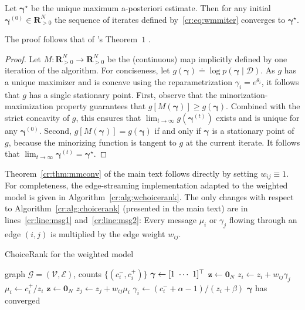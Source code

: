 \begin{theorem}
\label{cr:thm:wmmconv}
Let $\bm{\gamma}^\star$ be the unique maximum a-posteriori estimate.
Then for any initial $\bm{\gamma}^{(0)} \in \mathbf{R}^N_{> 0}$ the sequence of iterates defined by~\eqref{cr:eq:wmmiter} converges to $\bm{\gamma}^\star$.
\end{theorem}

The proof follows that of \citeauthor{hunter2004mm}'s Theorem~$1$ \citeyearpar{hunter2004mm}.

\begin{proof}
Let $M: \mathbf{R}^N_{>0} \to \mathbf{R}^N_{>0}$ be the (continuous) map implicitly defined by one iteration of the algorithm.
For conciseness, let $g(\bm{\gamma}) \doteq \log p(\bm{\gamma} \mid \mathcal{D})$.
As $g$ has a unique maximizer and is concave using the reparametrization $\gamma_i = e^{\theta_i}$, it follows that $g$ has a single stationary point.
First, observe that the minorization-maximization property guarantees that $g \left[ M(\bm{\gamma}) \right] \ge g(\bm{\gamma})$.
Combined with the strict concavity of $g$, this ensures that $\lim_{t \to \infty} g(\bm{\gamma}^{(t)})$ exists and is unique for any $\bm{\gamma}^{(0)}$.
Second, $g \left[ M(\bm{\gamma}) \right] = g(\bm{\gamma})$ if and only if $\bm{\gamma}$ is a stationary point of $g$, because the minorizing function is tangent to $g$ at the current iterate.
It follows that $\lim_{t \to \infty} \bm{\gamma}^{(t)} = \bm{\gamma}^{\star}$.
\end{proof}

Theorem~\ref{cr:thm:mmconv} of the main text follows directly by setting $w_{ij} \equiv 1$.
For completeness, the edge-streaming implementation adapted to the weighted model is given in Algorithm~\ref{cr:alg:wchoicerank}.
The only changes with respect to Algorithm~\ref{cr:alg:choicerank} (presented in the main text) are in lines~\ref{cr:line:msg1} and~\ref{cr:line:msg2}:
Every message $\mu_i$ or $\gamma_j$ flowing through an edge $(i,j)$ is multiplied by the edge weight $w_{ij}$.

\begin{algorithm}[ht]
  \caption{ChoiceRank for the weighted model}
  \label{cr:alg:wchoicerank}
  \begin{algorithmic}[1]
    \Require graph $\mathcal{G} = (\mathcal{V}, \mathcal{E})$, counts $\{ (c^-_i, c^+_i) \}$
    \State $\bm{\gamma} \gets [1 \ \cdots \ 1]^\Tr$
    \Repeat
      \State $\bm{z} \gets \bm{0}_N$
       $z_i \gets z_i + w_{ij} \gamma_j$ \label{cr:line:msg1}
       $\mu_i \gets c^+_i / z_i$
      \State $\bm{z} \gets \bm{0}_N$
       $z_j \gets z_j + w_{ij} \mu_i$ \label{cr:line:msg2}
       $\gamma_i \gets (c^-_i + \alpha - 1) / (z_i + \beta)$
    \Until $\bm{\gamma}$ has converged
  \end{algorithmic}
\end{algorithm}



